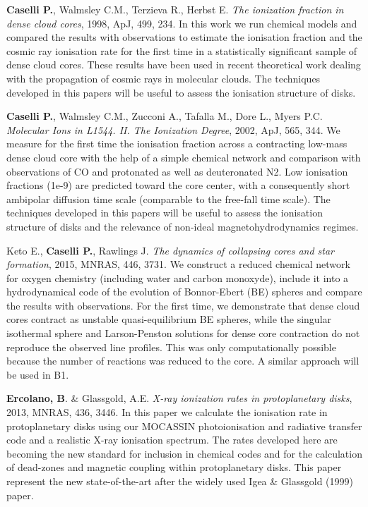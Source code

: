 \documentclass[10pt,fleqn,twoside]{article}
\begin{document}
\begin{literature}

\item \textbf{Caselli P.}, Walmsley C.M., Terzieva R., Herbst
  E. \textit{The ionization fraction in dense cloud cores}, 1998, ApJ,
  499, 234. In this work we run chemical models and compared the
  results with observations to estimate the ionisation fraction and
  the cosmic ray ionisation rate for the first time in a statistically
  significant sample of dense cloud cores. These results have been
  used in recent theoretical work dealing with the propagation of
  cosmic rays in molecular clouds. The techniques developed in this
  papers will be useful to assess the ionisation structure of disks.

\item \textbf{Caselli P.}, Walmsley C.M., Zucconi A., Tafalla M.,
  Dore L., Myers P.C. \textit{Molecular Ions in L1544. II. The
    Ionization Degree}, 2002, ApJ, 565, 344. We measure for the first
  time the ionisation fraction across a contracting low-mass dense
  cloud core with the help of a simple chemical network and comparison
  with observations of CO and protonated as well as deuteronated
  N2. Low ionisation fractions (1e-9) are predicted toward the core
  center, with a consequently short ambipolar diffusion time scale
  (comparable to the free-fall time scale). The techniques developed in this
  papers will be useful to assess the ionisation structure of disks
  and the relevance of non-ideal magnetohydrodynamics regimes. 

 \item Keto E., \textbf{Caselli P.}, Rawlings J. \textit{The dynamics
     of collapsing cores and star formation}, 2015, MNRAS, 446,
   3731. We construct a reduced chemical network for oxygen chemistry
   (including water and carbon monoxyde), include it into a
   hydrodynamical code of the evolution of Bonnor-Ebert (BE) spheres
   and compare the results with observations.  For the first time, we
   demonstrate that dense cloud cores contract as unstable
   quasi-equilibrium BE spheres, while the singular isothermal sphere
   and Larson-Penston solutions for dense core contraction do not
   reproduce the observed line profiles.  This was only
   computationally possible
   because the number of reactions was reduced to the core. A similar
   approach will be used in B1. 

\item \textbf{Ercolano, B}. \& Glassgold, A.E. {\em X-ray ionization rates in
    protoplanetary disks}, 2013, MNRAS, 436, 3446. In this paper we
  calculate the ionisation rate in protoplanetary disks using our
  MOCASSIN photoionisation and radiative transfer code and a realistic
  X-ray ionisation spectrum. The rates
  developed here are becoming the new standard for inclusion in
  chemical codes and for the calculation of dead-zones and magnetic
  coupling within protoplanetary disks. This paper represent the new
  state-of-the-art after the widely used Igea \& Glassgold (1999)
  paper. 


\end{literature}
\end{document}

